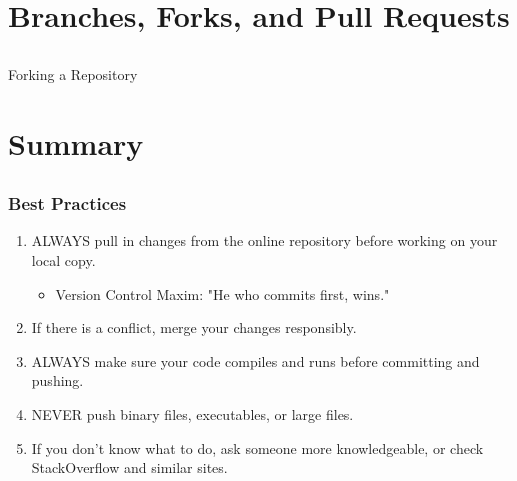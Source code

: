 \documentclass[]{beamer}
\begin{document}
\section{Branches, Forks, and Pull Requests}
\subsection{}

\begin{frame}[t]{Forking a Repository}

\end{frame}

\section{Summary}
\subsection{}
\begin{frame}[t]\frametitle{Best Practices}
  \begin{block}{}
    \begin{enumerate}
      \item ALWAYS pull in changes from the online repository before working on your local copy. 
        \begin{itemize}
          \item Version Control Maxim: "He who commits first, wins."
        \end{itemize}
      \item If there is a conflict, merge your changes responsibly.
      \item ALWAYS make sure your code compiles and runs before committing and pushing.
      \item NEVER push binary files, executables, or large files. 
      \item If you don't know what to do, ask someone more knowledgeable, or check StackOverflow and similar sites.
    \end{enumerate}
  \end{block}
\end{frame}
\end{document}
